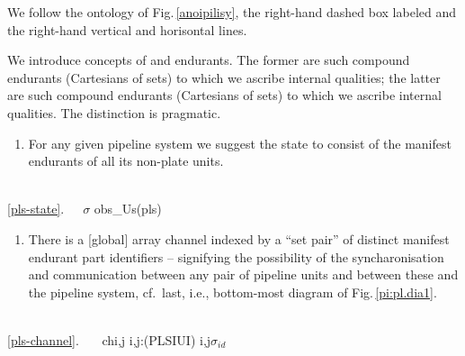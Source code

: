 
\label{pipe:Perdurants}

We follow the ontology of Fig.\,\vref{anoipilisy}, the
right-hand dashed box labeled  and the right-hand
vertical and horisontal lines. 

\label{tehran:State}

\begynd
\pind We introduce concepts of  and 
      endurants.
\begynd
\pind The former are such compound endurants (Cartesians of sets) \nyl
      to which we ascribe internal qualities;
\pind the latter are such compound endurants (Cartesians of sets) \nyl
      to which we  ascribe internal qualities.
\afslut
\pind The distinction is pragmatic.
\afslut


\begin{enumerate}\setei
\item \label{pls-state} For any given pipeline system we suggest the state to consist of
      the manifest endurants of  all
      its non-plate units.
\savei\end{enumerate}
\bp
{}\\
\ref{pls-state}.\ \ \ $\sigma$ {\EQ} obs\_Us(pls)
\ep

\label{tehran:Channel}

\begin{enumerate}\setei
\item \label{pls-channel} There is a [global] array channel \nyl
                          indexed by a ``set pair'' of distinct
                          manifest endurant part identifiers --
                          signifying the possibility of the
                          syncharonisation and communication between
                          any pair of pipeline units and between these
                          and the pipeline system, cf.\ last, i.e., bottom-most
                          diagram of Fig.\,\vref{pi:pl.dia1}.
\savei\end{enumerate}
\bp
{}\\
\ref{pls-channel}.\ \ \ {\LBRACE} ch{\LBRACKET}{\LBRACE}i,j{\RBRACE}{\RBRACKET} {\BAR} {\LBRACE}i,j{\RBRACE}:(PLSI{\BAR}UI) {\RDOT} {\LBRACE}i,j{\RBRACE}{\SUBSETEQ}$\sigma$$_{id}$ {\RBRACE} 
\ep


